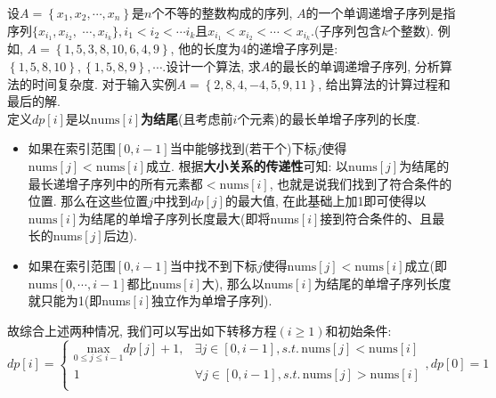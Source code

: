 \documentclass{article}
\begin{document}
\pagebreak

\begin{homeworkProblem}
	设$A=\left\{ x_1,x_2,\cdots ,x_n \right\} $是$n$个不等的整数构成的序列, $A$的一个单调递增子序列是指序列$\{ x_{i_1},x_{i_2},$
	$\cdots ,x_{i_k} \} ,i_1<i_2<\cdots i_k	$且$x_{i_1}<x_{i_2}<\cdots <x_{i_k}$.(子序列包含$k$个整数). 例如, $A=\left\{ 1,5,3,8,10,6,4,9 \right\} $, 他的长度为4的递增子序列是: $\left\{ 1,5,8,10 \right\} ,\left\{ 1,5,8,9 \right\} ,\cdots$.设计一个算法, 求$A$的最长的单调递增子序列, 分析算法的时间复杂度. 对于输入实例$A=\left\{ 2,8,4,-4,5,9,11 \right\} $, 给出算法的计算过程和最后的解.
	\\

	\solution 定义$dp[i]$是以$\text{nums}[i]$\textbf{为结尾}(且考虑前$i$个元素)的最长单增子序列的长度. 
    \begin{itemize}
        \item 如果在索引范围$[0,i-1]$当中能够找到(若干个)下标$j$使得$\text{nums}[j]<\text{nums}[i]$成立. 根据\textbf{大小关系的传递性}可知: 以$\text{nums}[j]$为结尾的最长递增子序列中的所有元素都$<\text{nums}[i]$, 也就是说我们找到了符合条件的位置. 那么在这些位置$j$中找到$dp[j]$的最大值, 在此基础上加1即可使得以$\text{nums}[i]$为结尾的单增子序列长度最大(即将nums$[i]$接到符合条件的、且最长的nums$[j]$后边).
        \item 如果在索引范围$[0,i-1]$当中找不到下标$j$使得$\text{nums}[j]<\text{nums}[i]$成立(即$\text{nums}[0,\cdots,i-1]$都比$\text{nums}[i]$大), 那么以nums$[i]$为结尾的单增子序列长度就只能为1(即nums$[i]$独立作为单增子序列).
    \end{itemize}

    故综合上述两种情况, 我们可以写出如下转移方程$(i\geq 1)$和初始条件:
    $$
    dp\left[ i \right] =\left\{ \begin{matrix}
        \underset{0\le j\le i-1}{\text{max}}dp\left[ j \right] +1,&		\exists j\in \left[ 0,i-1 \right] , s.t. \,\text{nums}\left[ j \right] <\text{nums}\left[ i \right]\\
        1&		\forall j\in \left[ 0,i-1 \right] , s.t. \,\text{nums}\left[ j \right] >\text{nums}\left[ i \right]\\
    \end{matrix} \right. , dp\left[ 0 \right] =1
    $$


\end{homeworkProblem}
\end{document}
